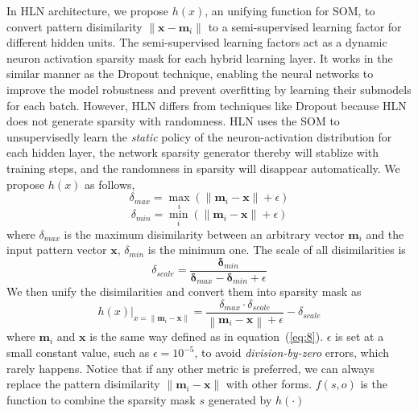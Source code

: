 \documentclass[3p,times,procedia]{elsarticle}
\begin{document}
In HLN architecture,
we propose $h(x)$, 
an unifying function for 
SOM, to convert pattern disimilarity
$\|\mathbf{x}-\mathbf{m}_i\|$ to
a semi-supervised learning factor for
different hidden units. 
The semi-supervised
learning factors act as a 
dynamic neuron activation 
sparsity mask for 
each hybrid learning layer.
It works in the similar manner  
as the Dropout 
technique\cite{srivastava2014dropout}, 
enabling the neural networks 
to improve the model robustness 
and prevent
overfitting by learning 
their submodels for 
each batch. However, HLN differs from 
techniques like Dropout because 
HLN does not generate sparsity with 
randomness. HLN uses the SOM
to unsupervisedly learn 
the \emph{static}
policy of the neuron-activation 
distribution for
each hidden layer, the network 
sparsity generator thereby
will stablize with training 
steps, and the
randomness in sparsity will 
disappear automatically.
We propose $h(x)$ as follows,
\begin{equation}
	\delta_{max} = \max_i\left(
	\|\mathbf{m}_i-\mathbf{x}\|+\epsilon
	\right)
	\label{eq:10}
\end{equation}
\begin{equation}
	\delta_{min} = \min_i\left(
	\|\mathbf{m}_i-\mathbf{x}\|+\epsilon
	\right)
	\label{eq:11}
\end{equation}
where $\delta_{max}$ is the maximum 
disimilarity
between an arbitrary vector 
$\mathbf{m}_i$
and the input pattern vector $\mathbf{x}$,
$\delta_{min}$ is the minimum one.
The scale of all disimilarities is
\begin{equation}
	\delta_{scale} = 
	\frac{\mathbf{\delta}_{min}}
	{\mathbf{\delta}_{max}-
	\mathbf{\delta}_{min} + \epsilon}
	\label{eq:12}
\end{equation}
We then unify the disimilarities 
and convert them into sparsity 
mask as
\begin{equation}
	h(x)|_{x=\|\mathbf{m}_i-\mathbf{x}\|}=
	\frac{\delta_{max}\cdot\delta_{scale}}
	{\left\|\mathbf{m}_i-\mathbf{x}\right\|
	+\epsilon}-\delta_{scale}
	\label{eq:13}
\end{equation}
where $\mathbf{m}_i$ and $\mathbf{x}$ 
is the same way defined as in 
equation~(\ref{eq:8}).
$\epsilon$ is set at a small constant
value, such as $\epsilon=10^{-5}$,
to avoid 
\emph{division-by-zero} errors,
which rarely happens. 
Notice that
if any other metric is preferred, 
we can
always replace the pattern 
disimilarity
$\|\mathbf{m}_i-\mathbf{x}\|$ with 
other forms.
$f(s,o)$ is the function to combine the 
sparsity mask $s$ generated by $h(\cdot)$ 
\end{document}

